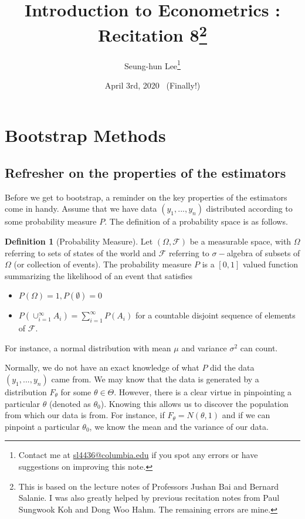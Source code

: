 \documentclass[12pt]{article}
\title{Introduction to Econometrics \ROM{2}: Recitation 8\footnote{This is based on the lecture notes of Professors Jushan Bai and Bernard Salanie. I was also greatly helped by previous recitation notes from Paul Sungwook Koh and Dong Woo Hahm. The remaining errors are mine. }}
\theoremstyle{definition}
\newtheorem{definition}{Definition}[section]
\theoremstyle{property}
\theoremstyle{assumption}
\theoremstyle{example}
\theoremstyle{comment}
\begin{document}
\linespread{1.25}
\onehalfspacing

\author{Seung-hun Lee\footnote{Contact me at \href{mailto:sl4436@columbia.edu}{sl4436@columbia.edu} if you spot any errors or have suggestions on improving this note.}}
\date{April 3rd, 2020 \ (Finally!)}
\maketitle
\thispagestyle{firstpage}

\section{Bootstrap Methods}
\subsection{Refresher on the properties of the estimators}
Before we get to bootstrap, a reminder on the key properties of the estimators come in handy. Assume that we have data $(y_1,...,y_n)$ distributed according to some probability measure $P$. The definition of a probability space is as follows.
\begin{mdframed}[backgroundcolor=blue!5] 
\begin{definition}[Probability Measure]
Let $(\Omega, \mathcal{F})$ be a measurable space, with $\Omega$ referring to sets of states of the world and $\mathcal{F}$ referring to $\sigma-$algebra of subsets of $\Omega$ (or collection of events). The probability measure $P$ is a $[0,1]$ valued function summarizing the likelihood of an event that satisfies
\begin{itemize}
\item $P(\Omega)=1, P(\emptyset)=0$
\item $P\left(\cup_{i=1}^\infty A_i\right)=\sum_{i=1}^\infty P(A_i)$ for a countable disjoint sequence of elements of $\mathcal{F}$. 
\end{itemize}
For instance, a normal distribution with mean $\mu$ and variance $\sigma^2$ can count.
\end{definition}
\end{mdframed}\par
Normally, we do not have an exact knowledge of what $P$ did the data $(y_1,...,y_n)$ came from. We may know that the data is generated by a distribution $F_\theta$ for some $\theta\in\Theta$. However, there is a clear virtue in pinpointing a particular $\theta$ (denoted as $\theta_0$). Knowing this allows us to discover the population from which our data is from. For instance, if $F_\theta = N(\theta,1)$ and if we can pinpoint a particular $\theta_0$, we know the mean and the variance of our data. \par
\end{document}
